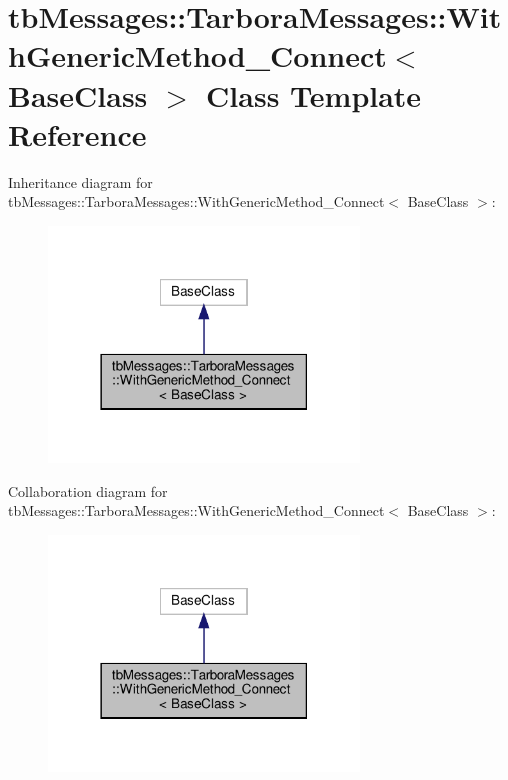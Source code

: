\hypertarget{classtbMessages_1_1TarboraMessages_1_1WithGenericMethod__Connect}{}\section{tb\+Messages\+:\+:Tarbora\+Messages\+:\+:With\+Generic\+Method\+\_\+\+Connect$<$ Base\+Class $>$ Class Template Reference}
\label{classtbMessages_1_1TarboraMessages_1_1WithGenericMethod__Connect}


Inheritance diagram for tb\+Messages\+:\+:Tarbora\+Messages\+:\+:With\+Generic\+Method\+\_\+\+Connect$<$ Base\+Class $>$\+:
\nopagebreak
\begin{figure}[H]
\begin{center}
\leavevmode
\includegraphics[width=234pt]{classtbMessages_1_1TarboraMessages_1_1WithGenericMethod__Connect__inherit__graph}
\end{center}
\end{figure}


Collaboration diagram for tb\+Messages\+:\+:Tarbora\+Messages\+:\+:With\+Generic\+Method\+\_\+\+Connect$<$ Base\+Class $>$\+:
\nopagebreak
\begin{figure}[H]
\begin{center}
\leavevmode
\includegraphics[width=234pt]{classtbMessages_1_1TarboraMessages_1_1WithGenericMethod__Connect__coll__graph}
\end{center}
\end{figure}
